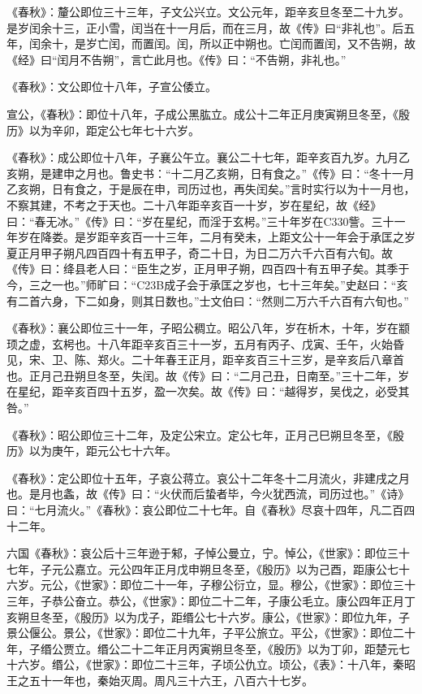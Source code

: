 \documentclass[]{article}
\begin{document}
《春秋》：釐公即位三十三年，子文公兴立。文公元年，距辛亥旦冬至二十九岁。是岁闰余十三，正小雪，闰当在十一月后，而在三月，故《传》曰``非礼也''。后五年，闰余十，是岁亡闰，而置闰。闰，所以正中朔也。亡闰而置闰，又不告朔，故《经》曰``闰月不告朔''，言亡此月也。《传》曰：``不告朔，非礼也。''

《春秋》：文公即位十八年，子宣公倭立。

宣公，《春秋》：即位十八年，子成公黑肱立。成公十二年正月庚寅朔旦冬至，《殷历》以为辛卯，距定公七年七十六岁。

《春秋》：成公即位十八年，子襄公午立。襄公二十七年，距辛亥百九岁。九月乙亥朔，是建申之月也。鲁史书：``十二月乙亥朔，日有食之。''《传》曰：``冬十一月乙亥朔，日有食之，于是辰在申，司历过也，再失闰矣。''言时实行以为十一月也，不察其建，不考之于天也。二十八年距辛亥百一十岁，岁在星纪，故《经》曰：``春无冰。''《传》曰：``岁在星纪，而淫于玄枵。''三十年岁在C330訾。三十一年岁在降娄。是岁距辛亥百一十三年，二月有癸未，上距文公十一年会于承匡之岁夏正月甲子朔凡四百四十有五甲子，奇二十日，为日二万六千六百有六旬。故《传》曰：绛县老人曰：``臣生之岁，正月甲子朔，四百四十有五甲子矣。其季于今，三之一也。''师旷曰：``C23B成子会于承匡之岁也，七十三年矣。''史赵曰：``亥有二首六身，下二如身，则其日数也。''士文伯曰：``然则二万六千六百有六旬也。''

《春秋》：襄公即位三十一年，子昭公稠立。昭公八年，岁在析木，十年，岁在颛顼之虚，玄枵也。十八年距辛亥百三十一岁，五月有丙子、戊寅、壬午，火始昏见，宋、卫、陈、郑火。二十年春王正月，距辛亥百三十三岁，是辛亥后八章首也。正月己丑朔旦冬至，失闰。故《传》曰：``二月己丑，日南至。''三十二年，岁在星纪，距辛亥百四十五岁，盈一次矣。故《传》曰：``越得岁，吴伐之，必受其咎。''

《春秋》：昭公即位三十二年，及定公宋立。定公七年，正月己巳朔旦冬至，《殷历》以为庚午，距元公七十六年。

《春秋》：定公即位十五年，子哀公蒋立。哀公十二年冬十二月流火，非建戌之月也。是月也螽，故《传》曰：``火伏而后蛰者毕，今火犹西流，司历过也。''《诗》曰：``七月流火。''《春秋》：哀公即位二十七年。自《春秋》尽哀十四年，凡二百四十二年。

六国《春秋》：哀公后十三年逊于邾，子悼公曼立，宁。悼公，《世家》：即位三十七年，子元公嘉立。元公四年正月戊申朔旦冬至，《殷历》以为己酉，距康公七十六岁。元公，《世家》：即位二十一年，子穆公衍立，显。穆公，《世家》：即位三十三年，子恭公奋立。恭公，《世家》：即位二十二年，子康公毛立。康公四年正月丁亥朔旦冬至，《殷历》以为戊子，距缗公七十六岁。康公，《世家》：即位九年，子景公偃公。景公，《世家》：即位二十九年，子平公旅立。平公，《世家》：即位二十年，子缗公贾立。缗公二十二年正月丙寅朔旦冬至，《殷历》以为丁卯，距楚元七十六岁。缗公，《世家》：即位二十三年，子顷公仇立。顷公，《表》：十八年，秦昭王之五十一年也，秦始灭周。周凡三十六王，八百六十七岁。
\end{document}

